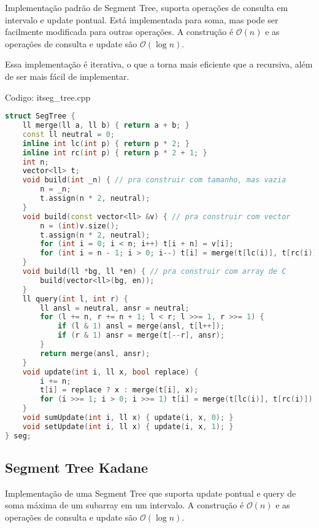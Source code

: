 \documentclass[10pt, a4paper, oneside]{book}
\begin{document}
Implementação padrão de Segment Tree, suporta operações de consulta em intervalo e update pontual. Está implementada para soma, mas pode ser facilmente modificada para outras operações. A construção é $\mathcal{O}(n)$ e as operações de consulta e update são $\mathcal{O}(\log n)$.



Essa implementação é iterativa, o que a torna mais eficiente que a recursiva, além de ser mais fácil de implementar.

\hfill

Codigo: itseg\_tree.cpp

\begin{lstlisting}[language=C++]
struct SegTree {
    ll merge(ll a, ll b) { return a + b; }
    const ll neutral = 0;
    inline int lc(int p) { return p * 2; }
    inline int rc(int p) { return p * 2 + 1; }
    int n;
    vector<ll> t;
    void build(int _n) { // pra construir com tamanho, mas vazia
        n = _n;
        t.assign(n * 2, neutral);
    }
    void build(const vector<ll> &v) { // pra construir com vector
        n = (int)v.size();
        t.assign(n * 2, neutral);
        for (int i = 0; i < n; i++) t[i + n] = v[i];
        for (int i = n - 1; i > 0; i--) t[i] = merge(t[lc(i)], t[rc(i)]);
    }
    void build(ll *bg, ll *en) { // pra construir com array de C
        build(vector<ll>(bg, en));
    }
    ll query(int l, int r) {
        ll ansl = neutral, ansr = neutral;
        for (l += n, r += n + 1; l < r; l >>= 1, r >>= 1) {
            if (l & 1) ansl = merge(ansl, t[l++]);
            if (r & 1) ansr = merge(t[--r], ansr);
        }
        return merge(ansl, ansr);
    }
    void update(int i, ll x, bool replace) {
        i += n;
        t[i] = replace ? x : merge(t[i], x);
        for (i >>= 1; i > 0; i >>= 1) t[i] = merge(t[lc(i)], t[rc(i)]);
    }
    void sumUpdate(int i, ll x) { update(i, x, 0); }
    void setUpdate(int i, ll x) { update(i, x, 1); }
} seg;
\end{lstlisting}
\hfill

\subsection{Segment Tree Kadane}


Implementação de uma Segment Tree que suporta update pontual e query de soma máxima de um subarray em um intervalo. A construção é $\mathcal{O}(n)$ e as operações de consulta e update são $\mathcal{O}(\log n)$.
\end{document}
